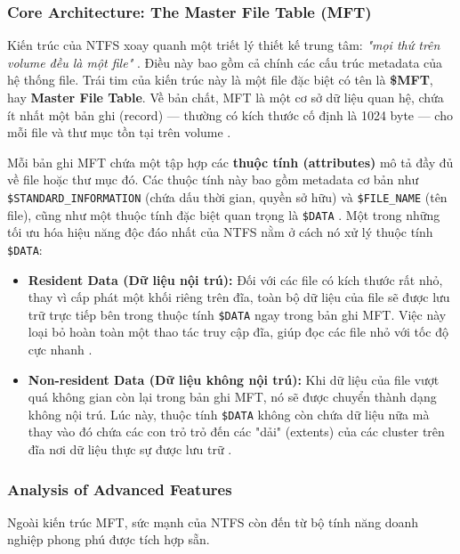 \documentclass[12pt]{article}
\begin{document}
\subsubsection{Core Architecture: The Master File Table (MFT)}
Kiến trúc của NTFS xoay quanh một triết lý thiết kế trung tâm: \textit{"mọi thứ trên volume đều là một file"} \parencite{Shafiei2012}. Điều này bao gồm cả chính các cấu trúc metadata của hệ thống file. Trái tim của kiến trúc này là một file đặc biệt có tên là \textbf{\$MFT}, hay \textbf{Master File Table}. Về bản chất, MFT là một cơ sở dữ liệu quan hệ, chứa ít nhất một bản ghi (record) --- thường có kích thước cố định là 1024 byte --- cho mỗi file và thư mục tồn tại trên volume \parencite{HarvardCS161Journaling}.

Mỗi bản ghi MFT chứa một tập hợp các \textbf{thuộc tính (attributes)} mô tả đầy đủ về file hoặc thư mục đó. Các thuộc tính này bao gồm metadata cơ bản như \texttt{\$STANDARD\_INFORMATION} (chứa dấu thời gian, quyền sở hữu) và \texttt{\$FILE\_NAME} (tên file), cũng như một thuộc tính đặc biệt quan trọng là \texttt{\$DATA} \parencite{Shafiei2012}. Một trong những tối ưu hóa hiệu năng độc đáo nhất của NTFS nằm ở cách nó xử lý thuộc tính \texttt{\$DATA}:
\begin{itemize}
    \item \textbf{Resident Data (Dữ liệu nội trú):} Đối với các file có kích thước rất nhỏ, thay vì cấp phát một khối riêng trên đĩa, toàn bộ dữ liệu của file sẽ được lưu trữ trực tiếp bên trong thuộc tính \texttt{\$DATA} ngay trong bản ghi MFT. Việc này loại bỏ hoàn toàn một thao tác truy cập đĩa, giúp đọc các file nhỏ với tốc độ cực nhanh \parencite{CIRCL2023}.
    
    \item \textbf{Non-resident Data (Dữ liệu không nội trú):} Khi dữ liệu của file vượt quá không gian còn lại trong bản ghi MFT, nó sẽ được chuyển thành dạng không nội trú. Lúc này, thuộc tính \texttt{\$DATA} không còn chứa dữ liệu nữa mà thay vào đó chứa các con trỏ trỏ đến các "dải" (extents) của các cluster trên đĩa nơi dữ liệu thực sự được lưu trữ \parencite{HarvardCS161Journaling}.
\end{itemize}

\subsubsection{Analysis of Advanced Features}
Ngoài kiến trúc MFT, sức mạnh của NTFS còn đến từ bộ tính năng doanh nghiệp phong phú được tích hợp sẵn.
\end{document}
